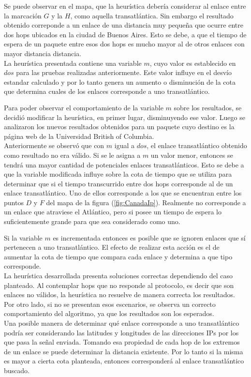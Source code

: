 Se puede observar en el mapa, que la heurística debería considerar al enlace entre la marcación $G$ y la $H$, como aquella transatlántica. Sin embargo el resultado obtenido correponde a un enlace de una distancia muy pequeña que ocurre entre dos hops ubicados en la ciudad de Buenos Aires. Esto se debe, a que el tiempo de espera de un paquete entre esos dos hops es mucho mayor al de otros enlaces con mayor distancia distancia. \\

La heurística presentada contiene una variable $m$, cuyo valor es establecido en $dos$ para las pruebas realizadas anteriormente. Este valor influye en el desvío estandar calculado y por lo tanto genera un aumento o disminución de la cota que determina cuales de los enlaces corresponde a uno transatlántico. 

Para poder observar el comportamiento de la variable $m$ sobre los resultados, se decidió modificar la heurística, en primer lugar, disminuyendo ese valor. Luego se analizaron los nuevos resultados obtenidos para un paquete cuyo destino es la página web de la Universidad British of Columbia. \\

Anteriormente se observó que con $m$ igual a $dos$, el enlace transatlántico obtenido como resultado no era válido. Si se le asigna a $m$ un valor menor, entonces se tendrá una mayor cantidad de potenciales enlaces transatlánticos. Esto se debe a que la variable modificada influye sobre la cota de tiempo que se utiliza para determinar que si el tiempo transcurrido entre dos hops corresponde al de un enlace transatlántico. Uno de ellos corresponde a los que se encuentran entre los puntos $D$ y $F$ del mapa de la figura (\ref{fig:CanadaIp}). Realmente no corresponde a un enlace que atraviese el Atlántico, pero si posee un tiempo de espera lo suficientemente grande para que sea considerado como uno. 

Si la variable $m$ es incrementada entonces es posible que se ignoren enlaces que sí pertenecen a uno transatlántico. El efecto de realizar esta acción es el de aumentar la cota de tiempo que compara cada enlace y determina a que tipo corresponde. \\

La heurística desarrollada presenta soluciones correctas dependiendo del caso planteado. Al contemplar hops que no responde al protocolo, es decir que son enlaces no válidos, la heurística no resuelve de manera correcta los resultados. Por otro lado, si no se presentan esos escenarios, se observa un correcto comportamiento del algoritmo, ya que los resultados son los esperados. \\

Una posible manera de determinar qué enlace corresponde a uno transatlántico podría ser considerando las latitudes y longitudes de las direcciones IPs por los que pasa la señal enviada. Tomando esa propiedad de cada hop de los extremos de un enlace se puede determinar la distancia existente. Por lo tanto si la misma es mayor a cierta cota planteada, entonces corresponderá al enlace transatlántico buscado. 

